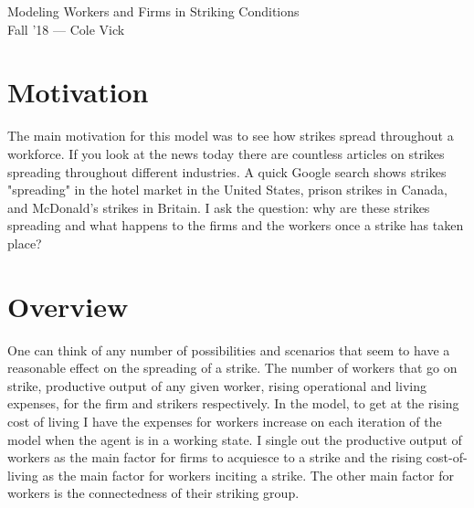 \documentclass[11pt]{article}
\newcommand{\yourname}{Cole Vick}
\begin{document}
{\Large 
\begin{center}{Modeling Workers and Firms in Striking Conditions} \\Fall '18 --- \yourname \end{center}}


\section{Motivation}\hrulefill

The main motivation for this model was to see how strikes spread throughout a workforce. If you look at the news today there are countless articles on strikes spreading throughout different industries. A quick Google search shows strikes "spreading" in the hotel market in the United States, prison strikes in Canada, and McDonald's strikes in Britain. I ask the question: why are these strikes spreading and what happens to the firms and the workers once a strike has taken place?
\section{Overview} \hrulefill

One can think of any number of possibilities and scenarios that seem to have a reasonable effect on the spreading of a strike. The number of workers that go on strike, productive output of any given worker, rising operational and living expenses, for the firm and strikers respectively. In the model, to get at the rising cost of living I have the expenses for workers increase on each iteration of the model when the agent is in a working state. I single out the productive output of workers as the main factor for firms to acquiesce to a strike and the rising cost-of-living as the main factor for workers inciting a strike. The other main factor for workers is the connectedness of their striking group.
\end{document}
